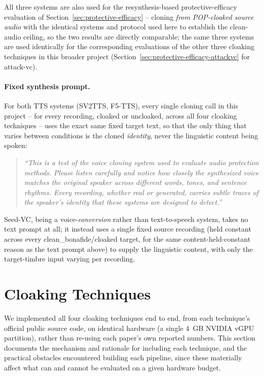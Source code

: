 \documentclass[11pt]{article}
\begin{document}
All three systems are also used for the resynthesis-based
protective-efficacy evaluation of Section~\ref{sec:protective-efficacy}
-- cloning \emph{from POP-cloaked source audio} with the identical
systems and protocol used here to establish the clean-audio ceiling,
so the two results are directly comparable; the same three systems are
used identically for the corresponding evaluations of the other three
cloaking techniques in this broader project
(Section~\ref{sec:protective-efficacy-attackvc} for attack-vc).

\paragraph{Fixed synthesis prompt.} For both TTS systems (SV2TTS,
F5-TTS), every single cloning call in this project -- for every
recording, cloaked or uncloaked, across all four cloaking techniques
-- uses the exact same fixed target text, so that the only thing that
varies between conditions is the cloned \emph{identity}, never the
linguistic content being spoken:

\begin{quote}
\itshape
``This is a test of the voice cloning system used to evaluate audio
protection methods. Please listen carefully and notice how closely
the synthesized voice matches the original speaker across different
words, tones, and sentence rhythms. Every recording, whether real or
generated, carries subtle traces of the speaker's identity that these
systems are designed to detect.''
\end{quote}

Seed-VC, being a voice-\emph{conversion} rather than text-to-speech
system, takes no text prompt at all; it instead uses a single fixed
source recording (held constant across every clean\_bonafide/cloaked
target, for the same content-held-constant reason as the text prompt
above) to supply the linguistic content, with only the target-timbre
input varying per recording.

\section{Cloaking Techniques}
\label{sec:cloaking}

We implemented all four cloaking techniques end to end, from each
technique's official public source code, on identical hardware (a
single 4~GB NVIDIA vGPU partition), rather than re-using each paper's
own reported numbers. This section documents the mechanism and
rationale for including each technique, and the practical obstacles
encountered building each pipeline, since these materially affect what
can and cannot be evaluated on a given hardware budget.
\end{document}
